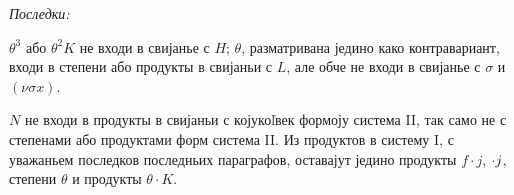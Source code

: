 ﻿\documentclass[11pt]{article}
\let\A\relax
\newcommand{\A}{\mathfrak A}
\begin{document}
\noindent\textit{Последки:}

$\theta^3$ або $\theta^2K$ не входи в свијанье с $H$; $\theta$, разматривана једино како контравариант, входи в степени або продукты в свијаньи с $L$, але обче не входи в свијанье с $\sigma$ и $(\nu\sigma x)$.

$N$ не входи в продукты в свијаньи с којукоľвек формоју система II, так само не с степенами або продуктами форм система II. Из продуктов в систему I, с уважаньем последков последньих параграфов, оставајут једино продукты $f\cdot j$, $\A\cdot j$, степени $\theta$ и продукты $\theta\cdot K$.
\end{document}
